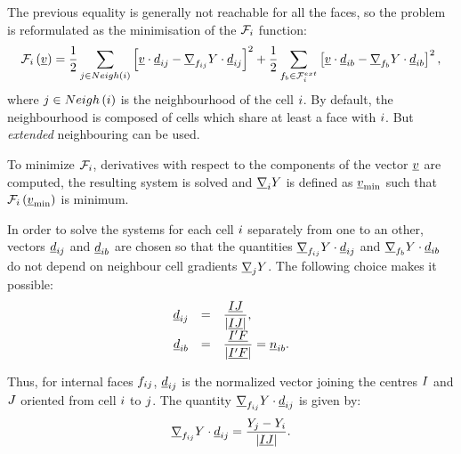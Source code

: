 The previous equality is generally not reachable for all the faces, so the
problem is reformulated as the minimisation of the $\mathcal{F}_\celli$ function:
%
\begin{equation}\label{eq:spadis:gradmc_function}
\mathcal{F}_\celli
\left( \variav \right) =
\dfrac{1}{2}\sum\limits_{\cellj \in \Neigh{\celli}  }\left[
 \variav   \cdot \vect{d}_\ij  -  \grad_{\fij} \varia   \cdot \vect{d}_\ij
\right]^2+
\dfrac{1}{2}\sum\limits_{ \fib \in \Faceb{\celli}}\left[
 \variav   \cdot \vect{d}_\ib  -  \grad_{\fib} \varia   \cdot \vect{d}_\ib
\right]^2,
\end{equation}
where $\cellj \in \Neigh{\celli} $ is the neighbourhood of the cell $\celli$. By default, the neighbourhood is composed of
cells which share at least a face with $\celli$. But \emph{extended} neighbouring can be used.

To minimize $\mathcal{F}_\celli$, derivatives with respect to the components of the
vector $\variav  $ are computed, the resulting system is solved and $\grad_\celli \varia$ is defined
as $\variav_{\min}$ such that $\mathcal{F}_\celli \left( \variav_{\min}\right)$ is minimum.

In order to solve the systems for each cell $\celli$ separately from one to an other,
vectors $\vect{d}_\ij$ and $\vect{d}_\ib$ are chosen so that the quantities
$\grad_{\fij} \varia   \cdot \vect{d}_\ij $ and $\grad_{\fib} \varia   \cdot \vect{d}_\ib $
do not depend on neighbour cell gradients  $\grad_{\cellj} \varia $.
The following choice makes it possible:
\begin{equation}\label{eq:spadis:gradmc_scalar_d_choice}
\begin{array}{r c l}
\vect{d}_\ij &=& \dfrac{\vect{\centi \centj}}{\norm{\vect{\centi \centj}}}, \\
\vect{d}_\ib &=& \dfrac{\vect{\centip \centf}}{\norm{\vect{\centip \centf}}}= \vect{n}_\ib .
\end{array}
\end{equation}

Thus, for internal faces $\fij$, $\vect{d}_\ij$ is the normalized vector joining
the centres $\centi$ and $\centj$ oriented from cell $\celli$ to $\cellj$.
The quantity  $\grad_{\fij} \varia   \cdot \vect{d}_\ij$ is given by:
\begin{equation}
\grad_{\fij} \varia   \cdot \vect{d}_\ij =\dfrac{\varia_\cellj - \varia_\celli }{\norm{\vect{\centi \centj}}}.
\end{equation}

